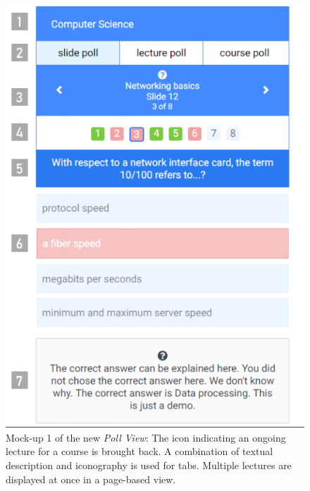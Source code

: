 \begin{figure}[ht]
	\begin{minipage}[t]{\textwidth}
		\centering
		\includegraphics[width=.7\textwidth]{mockups/poll_view_enhancement.png}
		\captionsetup{width=.8\linewidth}
		\caption{Mock-up 1 of the new \emph{Poll View}:
			The icon indicating an ongoing lecture for a course is brought back.
			A combination of textual description and iconography is used for tabs.
			Multiple lectures are displayed at once in a page-based view.
		}
		\label{figure:pollviewenhanvement1}
	\end{minipage}
\end{figure}

